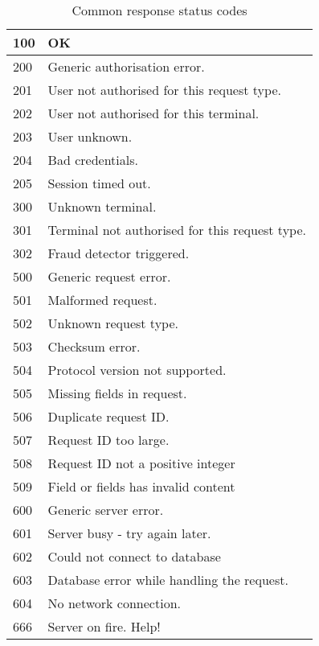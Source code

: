 \documentclass[a4paper,11pt]{article}
\newcommand{\rightcellwidth}{25em}
\begin{document}
\begin{table}[!hp]
  \begin{tabular}{|l|p{\rightcellwidth}|}
    \hline
      100  & OK \\\hline\hline
      200  & Generic authorisation error.\\\hline
      201  & User not authorised for this request type.\\\hline
      202  & User not authorised for this terminal.\\\hline
      203  & User unknown.\\\hline
      204  & Bad credentials.\\\hline
      205  & Session timed out.\\\hline
      300  & Unknown terminal.\\\hline
      301  & Terminal not authorised for this request
             type.\\\hline
      302  & Fraud detector triggered.\\\hline\hline
      500  & Generic request error.\\\hline
      501  & Malformed request.\\\hline
      502  & Unknown request type.\\\hline
      503  & Checksum error.\\\hline
      504  & Protocol version not supported.\\\hline
      505  & Missing fields in request.\\\hline
      506  & Duplicate request ID.\\\hline
      507  & Request ID too large.\\\hline
      508  & Request ID not a positive integer\\\hline
      509  & Field or fields has invalid content\\\hline\hline
      600  & Generic server error.\\\hline
      601  & Server busy - try again later.\\\hline
      602  & Could not connect to database\\\hline
      603  & Database error while handling the request.\\\hline
      604  & No network connection.\\\hline
      666  & Server on fire. Help!\\\hline
  \end{tabular} 
  \caption{Common response status codes}\label{tab:statusCodes}
\end{table}
\end{document}
